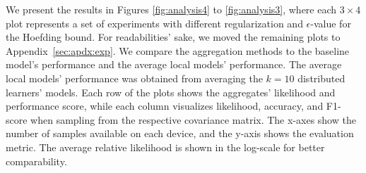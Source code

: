 We present the results in Figures \ref{fig:analysis4} to \ref{fig:analysis3}, where each $3\times4$ plot represents a set of experiments with different regularization and $\epsilon$-value for the Hoefding bound. 
For readabilities' sake, we moved the remaining plots to Appendix~\ref{sec:apdx:exp}.
We compare the aggregation methods to the baseline model's performance and the average local models' performance. 
The average local models' performance was obtained from averaging the $k=10$ distributed learners' models.
Each row of the plots shows the aggregates' likelihood and performance score, while each column visualizes likelihood, accuracy, and F1-score when sampling from the respective covariance matrix.
The x-axes show the number of samples available on each device, and the y-axis shows the evaluation metric.
The average relative likelihood is shown in the log-scale for better comparability.

